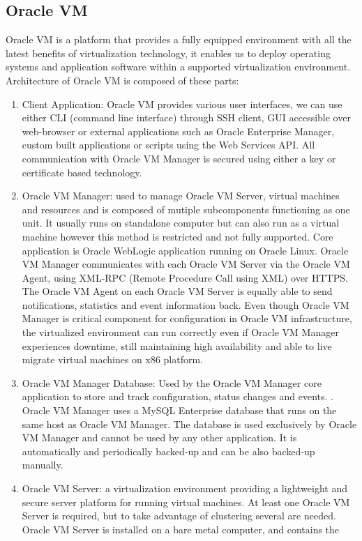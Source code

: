 \subsection{Oracle VM}
Oracle VM is a platform that provides a fully equipped environment with all the latest benefits of virtualization technology, it enables us to deploy operating systems and application software within a supported virtualization environment.
Architecture of Oracle VM is composed of these parts:
\begin{enumerate}
\item Client Application: Oracle VM provides various user interfaces, we can use either CLI (command line interface) through SSH client, GUI accessible over web-browser or external applications such as Oracle Enterprise Manager, custom built applications or scripts using the Web Services API. All communication with Oracle VM Manager is secured using either a key or certificate based technology.
\item Oracle VM Manager: used to manage Oracle VM Server, virtual machines and resources and is composed of mutiple subcomponents functioning as one unit. It usually runs on standalone computer but can also run as a virtual machine however this method is restricted and not fully supported. Core application is Oracle WebLogic application running on Oracle Linux. Oracle VM Manager communicates with each Oracle VM Server via the Oracle VM Agent, using XML-RPC (Remote Procedure Call using XML) over HTTPS.  The Oracle VM Agent on each Oracle VM Server is equally able to send notifications, statistics and event information back. Even though Oracle VM Manager is critical component for configuration in Oracle VM infrastructure, the virtualized environment can run correctly even if Oracle VM Manager experiences downtime, still maintaining high availability and able to live migrate virtual machines on x86 platform.
\item Oracle VM Manager Database:  Used by the Oracle VM Manager core application to store and track configuration, status changes and events. . Oracle VM Manager uses a MySQL Enterprise database that runs on the same host as Oracle VM Manager. The database is used exclusively by Oracle VM Manager and cannot be used by any other application. It is automatically and periodically backed-up and can be also backed-up manually.
\item Oracle VM Server: a virtualization environment providing a lightweight and secure server platform for running virtual machines. At least one Oracle VM Server is required, but to take advantage of clustering several are needed. Oracle VM Server is installed on a bare metal computer, and contains the 

\end{enumerate}
